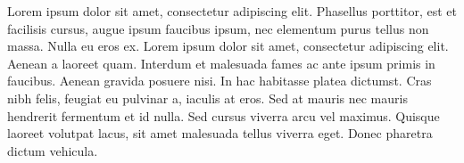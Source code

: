  Lorem ipsum dolor sit amet, consectetur adipiscing elit. Phasellus porttitor, est et facilisis cursus, augue ipsum faucibus ipsum, nec elementum purus tellus non massa. Nulla eu eros ex. Lorem ipsum dolor sit amet, consectetur adipiscing elit. Aenean a laoreet quam. Interdum et malesuada fames ac ante ipsum primis in faucibus. Aenean gravida posuere nisi. In hac habitasse platea dictumst. Cras nibh felis, feugiat eu pulvinar a, iaculis at eros. Sed at mauris nec mauris hendrerit fermentum et id nulla. Sed cursus viverra arcu vel maximus. Quisque laoreet volutpat lacus, sit amet malesuada tellus viverra eget. Donec pharetra dictum vehicula. \cite{interpretation-of-Computer-Programs}
